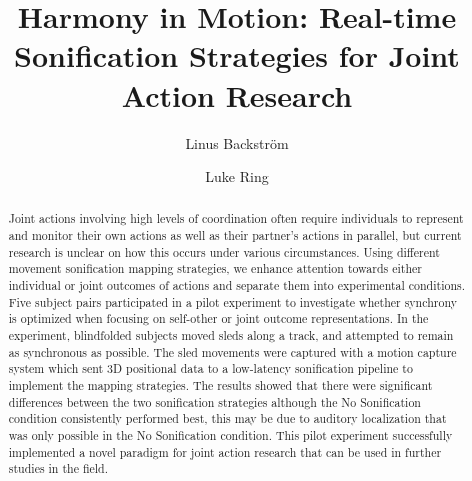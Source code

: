 \documentclass[10pt,a4paper,onecolumn]{article}
\title{Harmony in Motion: Real-time Sonification Strategies for Joint Action Research}
\author[1]{Linus Backström}
\author[1]{Luke Ring}
\affil[1]{Aarhus University}
\date{\vspace{-5ex}}
\makeatletter
\def\maketitle{{%
  \renewenvironment{tabular}[2][]
    {\begin{flushleft}}
    {\end{flushleft}}
  \AB@maketitle}}
\makeatother
\begin{document}
    \maketitle
      \begin{abstract}
  Joint actions involving high levels of coordination often require individuals to represent and monitor their own actions as well as their partner's actions in parallel, but current research is unclear on how this occurs under various circumstances. Using different movement sonification mapping strategies, we enhance attention towards either individual or joint outcomes of actions and separate them into experimental conditions. Five subject pairs participated in a pilot experiment to investigate whether synchrony is optimized when focusing on self-other or joint outcome representations. In the experiment, blindfolded subjects moved sleds along a track, and attempted to remain as synchronous as possible. The sled movements were captured with a motion capture system which sent 3D positional data to a low-latency sonification pipeline to implement the mapping strategies. The results showed that there were significant differences between the two sonification strategies although the No Sonification condition consistently performed best, this may be due to auditory localization that was only possible in the No Sonification condition. This pilot experiment successfully implemented a novel paradigm for joint action research that can be used in further studies in the field.
  \end{abstract}
  
\end{document}
